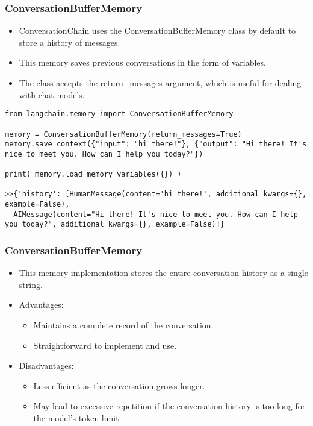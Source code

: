 \begin{frame}[fragile]
\frametitle{ConversationBufferMemory}

\begin{itemize}
    \item ConversationChain uses the ConversationBufferMemory class by default to store a history of messages.
    \item This memory saves previous conversations in the form of variables.
    \item The class accepts the return\_messages argument, which is useful for dealing with chat models.
\end{itemize}

\begin{lstlisting}
from langchain.memory import ConversationBufferMemory

memory = ConversationBufferMemory(return_messages=True)
memory.save_context({"input": "hi there!"}, {"output": "Hi there! It's nice to meet you. How can I help you today?"})

print( memory.load_memory_variables({}) )

>>{'history': [HumanMessage(content='hi there!', additional_kwargs={}, example=False),
  AIMessage(content="Hi there! It's nice to meet you. How can I help you today?", additional_kwargs={}, example=False)]}
\end{lstlisting}

\end{frame}

\begin{frame}[fragile]
\frametitle{ConversationBufferMemory}

\begin{itemize}
    \item This memory implementation stores the entire conversation history as a single string.
    \item Advantages:
    \begin{itemize}
        \item Maintains a complete record of the conversation.
        \item Straightforward to implement and use.
    \end{itemize}
    \item Disadvantages:
    \begin{itemize}
        \item Less efficient as the conversation grows longer.
        \item May lead to excessive repetition if the conversation history is too long for the model's token limit.
    \end{itemize}
\end{itemize}

\end{frame}

